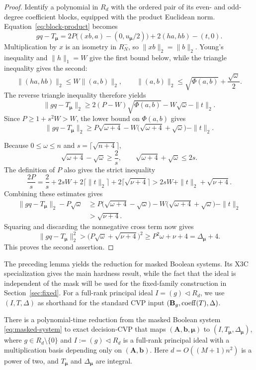 \begin{proof}
Identify a polynomial in \(R_d\) with the ordered pair of its
even- and odd-degree coefficient blocks, equipped with the product Euclidean
norm.
Equation~\eqref{eq:block-product} becomes
\[
 gq-T_{\boldsymbol\mu}
 =2P\bigl((xb,a)-(0,u_{\boldsymbol\mu}/2)\bigr)
  +2(ha,hb)-(t,0).
\]
Multiplication by $x$ is an isometry in $R_N^-$, so
\(\|xb\|_2=\|b\|_2\).  Young's inequality and
\(\|h\|_1=W\) give the first bound below, while the triangle inequality gives
the second:
\[
 \|(ha,hb)\|_2\leq W\|(a,b)\|_2,
 \qquad
 \|(a,b)\|_2\leq\sqrt{\Phi(a,b)}+\frac{\sqrt\omega}{2}.
\]
The reverse triangle inequality therefore yields
\[
 \|gq-T_{\boldsymbol\mu}\|_2
 \geq2(P-W)\sqrt{\Phi(a,b)}-W\sqrt\omega-\|t\|_2.
\]
Since $P\geq1+s^2W>W$, the lower bound on \(\Phi(a,b)\) gives
\[
 \|gq-T_{\boldsymbol\mu}\|_2
 \geq P\sqrt{\omega+4}
   -W\bigl(\sqrt{\omega+4}+\sqrt\omega\bigr)-\|t\|_2.
\]

Because $0\leq\omega\leq n$ and
\(s=\lceil\sqrt{n+4}\rceil\),
\[
 \sqrt{\omega+4}-\sqrt\omega\geq\frac2s,
 \qquad
 \sqrt{\omega+4}+\sqrt\omega\leq2s.
\]
The definition of $P$ also gives the strict inequality
\[
 \frac{2P}{s}
 =\frac2s+2sW+2\lceil\|t\|_2\rceil
   +2\lceil\sqrt{\nu+4}\rceil
 >2sW+\|t\|_2+\sqrt{\nu+4}.
\]
Combining these estimates gives
\[
\begin{aligned}
 \|gq-T_{\boldsymbol\mu}\|_2-P\sqrt\omega
 &\geq P\bigl(\sqrt{\omega+4}-\sqrt\omega\bigr)
   -W\bigl(\sqrt{\omega+4}+\sqrt\omega\bigr)-\|t\|_2 \\
 &>\sqrt{\nu+4}.
\end{aligned}
\]
Squaring and discarding the nonnegative cross term now gives
\[
 \|gq-T_{\boldsymbol\mu}\|_2^2
 >\bigl(P\sqrt\omega+\sqrt{\nu+4}\bigr)^2
 \geq P^2\omega+\nu+4
 =\Delta_{\boldsymbol\mu}+4.
\]
This proves the second assertion.
\end{proof}

The preceding lemma yields the reduction for masked Boolean
systems.  Its X3C specialization gives the main hardness result, while the
fact that the ideal is independent of the mask will be used for the
fixed-family construction in Section~\ref{sec:fixed}.
For a full-rank principal ideal \(I=(g)\lhd R_d\), we use
\((I,T,\Delta)\) as shorthand for the standard CVP input
\((\mathbf B_g,\operatorname{coeff}(T),\Delta)\).

\begin{theorem}
\label{thm:compiler}
There is a polynomial-time reduction from the masked Boolean system
\eqref{eq:masked-system} to exact decision-CVP that maps
\((\mathbf A,\mathbf b,\boldsymbol\mu)\) to
\((I,T_{\boldsymbol\mu},\Delta_{\boldsymbol\mu})\), where
\(g\in R_d\setminus\{0\}\) and
\(I\mathrel{:=}(g)\lhd R_d\) is a full-rank principal ideal with a multiplication
basis depending only on \((\mathbf A,\mathbf b)\).
Here \(d=O((M+1)n^2)\) is a power of two, and
\(T_{\boldsymbol\mu}\) and \(\Delta_{\boldsymbol\mu}\) are integral.
\end{theorem}

